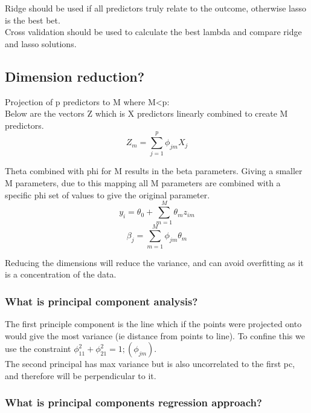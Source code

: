 \documentclass[11pt]{scrartcl} %
\begin{document}
Ridge should be used if all predictors truly relate to the outcome, otherwise lasso is the best bet.\\

Cross validation should be used to calculate the best lambda and compare ridge and lasso solutions.

\subsection{Dimension reduction?}

Projection of p predictors to M where M<p:\\

Below are the vectors Z which is X predictors linearly combined to create M predictors.
\begin{equation}
	Z_m = \sum^p_{j=1}{\phi_{jm}X_j}
\end{equation}

Theta combined with phi for M results in the beta parameters. Giving a smaller M parameters, due to this
mapping all M parameters are combined with a specific phi set of values to give the original parameter.
\begin{equation}
	y_i= \theta_0 + \sum^M_{m=1}{\theta_mz_{im}}
\end{equation}
\begin{equation}
	\beta_j = \sum^M_{m=1}{\phi_{jm}\theta_m}
\end{equation}

Reducing the dimensions will reduce the variance, and can avoid overfitting as it is a concentration
of the data.

\subsubsection{What is principal component analysis?}

The first principle component is the line which if the points were projected onto would give the
most variance (ie distance from points to line). To confine this we use the constraint 
\(\phi_{11}^2 + \phi_{21}^2 =1; (\phi_{jm})\).\\

The second principal has max variance but is also uncorrelated to the first pc, and therefore will
be perpendicular to it.

\subsubsection{What is principal components regression approach?}
\end{document}

